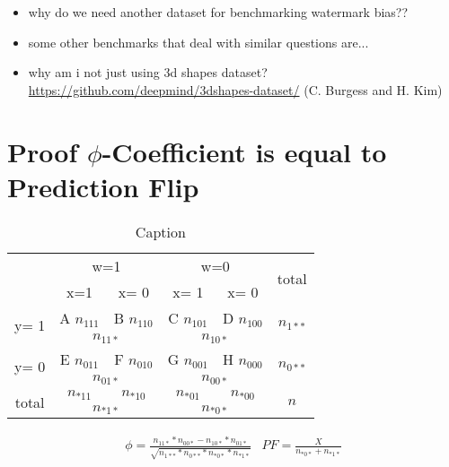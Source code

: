 \begin{itemize}
    \item why do we need another dataset for benchmarking watermark bias??
    \item some other benchmarks that deal with similar questions are...
    \item why am i not just using 3d shapes dataset? \url{https://github.com/deepmind/3dshapes-dataset/} (C. Burgess and H. Kim)
\end{itemize}


\section{Proof $\phi$-Coefficient is equal to Prediction Flip}
\label{appendix:phi_equals_pf}
\begin{table}[t]
    \centering
\newlength{\width}
\begin{tabular}{|c|c|c|c|c|c|}
    \hline
     \multirow{2}{\width}{}& \multicolumn{2}{|c|}{w=1} &\multicolumn{2}{|c|}{w=0} & \multirow{2}{\width}{total}  \\  \cline{2-5}
     & x=1 & x= 0 & x= 1& x= 0 &\\ \hline
    \multirow{2}{\width}{y= 1} & A $n_{111}$ & B $n_{110}$& C $n_{101}$& D $n_{100}$&\multirow{2}{\width}{$n_{1**}$}    \\ \cline{2-5}
    & \multicolumn{2}{|c|}{$n_{11*}$ }& \multicolumn{2}{|c|}{$n_{10*}$} &  \\ \hline 
    \multirow{2}{\width}{y= 0} & E $n_{011}$& F $n_{010}$& G $n_{001}$& H $n_{000}$& \multirow{2}{\width}{ $n_{0**}$} \\ \cline{2-5}
    & \multicolumn{2}{|c|}{$n_{01*}$} & \multicolumn{2}{|c|}{$n_{00*}$} & \\ \hline 
    \multirow{2}{\width}{total} & $n_{*11}$&  $n_{*10}$&  $n_{*01}$&$n_{*00}$& \multirow{2}{\width}{ $n$ } \\ \cline{2-5}
    & \multicolumn{2}{|c|}{$n_{*1*}$} & \multicolumn{2}{|c|}{$n_{*0*}$} & \\ \hline
\end{tabular}
    \caption{Caption}
    \label{tab:tBLE}
\end{table}

\begin{align*}
\phi = \frac{n_{11*} * n_{00*} - n_{10*}*n_{01*}}{\sqrt{n_{1**}*n_{0**}*n_{*0*}*n_{*1*}}} 
& PF = \frac{X}{n_{*0*}+n_{*1*}}
\end{align*}


